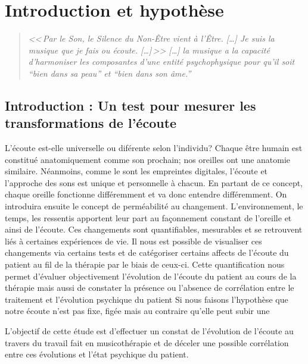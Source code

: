 \chapter{Introduction et hypothèse}

\label{jeSuisLaMusique:viret}
\begin{quotation}
\emph{<<\,\emph{Par le Son, le Silence du Non-Être vient à l'Être}. [\dots] 
\textsl{Je suis}
	\emph{la musique que je fais ou écoute}. [\dots]\,>>
[\ldots] \emph{la musique a la capacité d'harmoniser
les composantes d'une entité psychophysique pour qu'il soit ``bien
dans sa peau'' et ``bien dans son âme.}''}\, \autocite[ch. 1,  p. 8]{viret:b}
\end{quotation}







\section{Introduction : Un test pour mesurer les trans\-for\-ma\-tions de l'écoute}

L'écoute est-elle universelle ou diférente selon l'individu?
 Chaque être humain est constitué anatomiquement comme son prochain;
 nos oreilles ont  une anatomie similaire. Néanmoins, comme le sont 
les empreintes digitales, l'écoute et l'approche des sons est unique
et personnelle à chacun. En partant de ce concept, chaque oreille
fonctionne différemment et va donc entendre différemment. On
introduira ensuite le concept de perméabilité au
changement. L'environnement, le temps, les ressentis apportent leur
part au façonnement constant de l'oreille et ainsi de l'écoute. Ces
changements sont quantifiables, mesurables et se retrouvent liés à
certaines expériences de vie. Il nous est possible de visualiser ces
changements via certains tests et de catégoriser certains affects de
l'écoute du patient au fil de la thérapie par le biais de
ceux-ci. Cette quantification nous permet d'évaluer objectivement
l'évolution de l'écoute du patient au cours de la thérapie  mais aussi
de constater la présence ou l'absence de corrélation entre le
traitement et l'évolution psychique du patient
Si nous faisons l'hypothèse que notre écoute n'est pas fixe, figée mais au contraire qu'elle 
peut subir une 


L'objectif de cette étude est d'effectuer  un constat de l'évolution de l'écoute au travers du travail fait en 
musicothérapie et de déceler une possible corrélation entre ces
évolutions et l'état psychique du patient.


